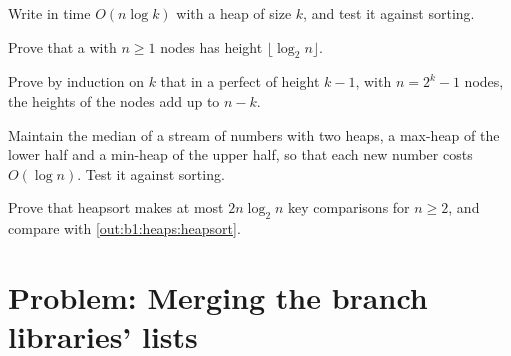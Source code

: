 \begin{exercise}[$\star\star$]\label{exo:b1:heaps:8}
Write  in time $O(n \log k)$ with a heap of size $k$, and test it against sorting.
\end{exercise}

\begin{exercise}[$\star\star$]\label{exo:b1:heaps:9}
Prove that a  with $n \geq 1$ nodes has height $\lfloor \log_2 n \rfloor$.
\end{exercise}

\begin{exercise}[$\star\star\star$]\label{exo:b1:heaps:10}
Prove by induction on $k$ that in a perfect  of height $k - 1$, with $n = 2^k - 1$ nodes, the heights of the
nodes add up to $n - k$.
\end{exercise}

\begin{exercise}[$\star\star\star$]\label{exo:b1:heaps:11}
Maintain the median of a stream of numbers with two heaps, a max-heap of the lower half and a min-heap of the upper
half, so that each new number costs $O(\log n)$. Test it against sorting.
\end{exercise}

\begin{exercise}[$\star\star\star$]\label{exo:b1:heaps:12}
Prove that heapsort makes at most $2n \log_2 n$ key comparisons for $n \geq 2$, and compare with
\cref{out:b1:heaps:heapsort}.
\end{exercise}

\section{Problem: Merging the branch libraries' lists}\label{sec:b1:heaps:problem}

